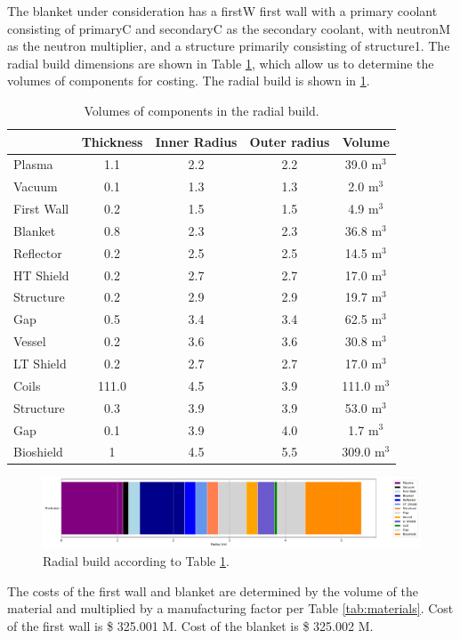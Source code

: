 The blanket under consideration has a firstW first wall with a primary coolant consisting of primaryC and secondaryC as the secondary coolant, with neutronM as the neutron multiplier, and a structure primarily consisting of structure1. The radial build dimensions are shown in Table \ref{tab:volumes}, which allow us to determine the volumes of components for costing.  The radial build is shown in \ref{fig:radial}.  \\


\begin{table}[h!]
    \centering
    \begin{tabular}{l c  c c c}
    \hline
        &	Thickness	&	Inner Radius	&	Outer radius	&	Volume		\\
        \hline
Plasma	&	1.1	&	2.2	&	2.2	&	39.0	m$^{3}$	\\
Vacuum	&	0.1	&	1.3	&	1.3	&	2.0	m$^{3}$	\\
First Wall	&	0.2	&	1.5	&	1.5	&	4.9	m$^{3}$	\\
Blanket	&	0.8	&	2.3	&	2.3	&	36.8	m$^{3}$	\\
Reflector	&	0.2	&	2.5	&	2.5	&	14.5	m$^{3}$	\\
HT Shield	&	0.2	&	2.7	&	2.7	&	17.0	m$^{3}$	\\
Structure	&	0.2	&	2.9	&	2.9	&	19.7	m$^{3}$	\\
Gap	&	0.5	&	3.4	&	3.4	&	62.5	m$^{3}$	\\
Vessel	&	0.2	&	3.6	&	3.6	&	30.8	m$^{3}$	\\
LT Shield	&	0.2	&	2.7	&	2.7	&	17.0	m$^{3}$	\\
Coils	&	111.0	&	4.5	&	3.9	&	111.0	m$^{3}$	\\
Structure	&	0.3	&	3.9	&	3.9	&	53.0	m$^{3}$	\\
Gap	&	0.1	&	3.9	&	4.0	&	1.7	m$^{3}$	\\
Bioshield	&	1	&	4.5	&	5.5	&	309.0	m$^{3}$	\\

        \hline
    \end{tabular}
    \caption{Volumes of components in the radial build.}
    \label{tab:volumes}
\end{table}

\begin{figure}
    \centering
    \includegraphics[width=0.9\linewidth]{Figures/radial_build.pdf}
    \caption{Radial build according to Table \ref{tab:volumes}.}
    \label{fig:radial}
\end{figure}



The costs of the first wall and blanket are determined by the volume of the material and multiplied by a manufacturing factor per Table \ref{tab:materials}.   Cost of the first wall is \$ 325.001 M.  Cost of the blanket is \$ 325.002 M.

